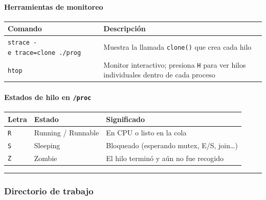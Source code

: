 \documentclass[
  spanish,
]{article}
\newcounter{none} %
\begin{document}
\paragraph{Herramientas de monitoreo}\label{herramientas-de-monitoreo}

{\def\LTcaptype{none} %
\begin{longtable}[]{@{}
  >{\raggedright\arraybackslash}p{}
  >{\raggedright\arraybackslash}p{}@{}}
\toprule\noalign{}
\begin{minipage}[b]{\linewidth}\raggedright
Comando
\end{minipage} & \begin{minipage}[b]{\linewidth}\raggedright
Descripción
\end{minipage} \\
\midrule\noalign{}
\endhead
\bottomrule\noalign{}
\endlastfoot
\texttt{strace\ -e\ trace=clone\ ./prog} & Muestra la llamada
\texttt{clone()} que crea cada hilo \\
\texttt{htop} & Monitor interactivo; presiona \texttt{H} para ver hilos
individuales dentro de cada proceso \\
\end{longtable}
}

\paragraph{\texorpdfstring{Estados de hilo en
\texttt{/proc}}{Estados de hilo en /proc}}\label{estados-de-hilo-en-proc}

{\def\LTcaptype{none} %
\begin{longtable}[]{@{}lll@{}}
\toprule\noalign{}
Letra & Estado & Significado \\
\midrule\noalign{}
\endhead
\bottomrule\noalign{}
\endlastfoot
\texttt{R} & Running / Runnable & En CPU o listo en la cola \\
\texttt{S} & Sleeping & Bloqueado (esperando mutex, E/S, join\ldots) \\
\texttt{Z} & Zombie & El hilo terminó y aún no fue recogido \\
\end{longtable}
}

\begin{center}\rule{0.5\linewidth}{0.5pt}\end{center}

\subsubsection{Directorio de trabajo}\label{directorio-de-trabajo}
\end{document}
